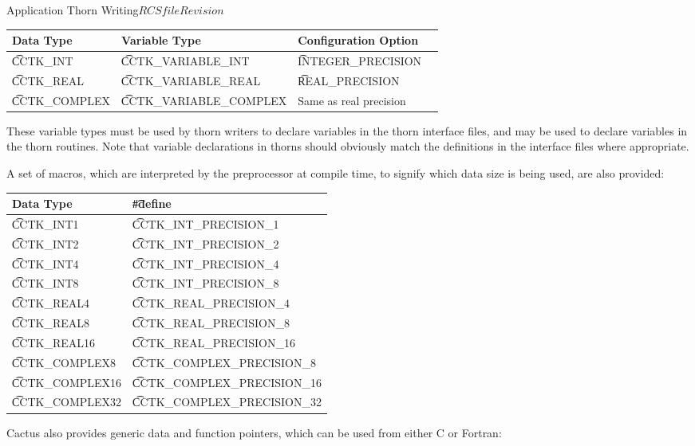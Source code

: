 \begin{cactuspart}{Application Thorn Writing}{$RCSfile$}{$Revision$}
\begin{center}
\begin{tabular}{|l|l|l|l|}
\hline
Data Type          & Variable Type & Configuration Option\\
\hline
{\t CCTK\_INT}     & {\t CCTK\_VARIABLE\_INT} & {\t INTEGER\_PRECISION}\\
{\t CCTK\_REAL}    & {\t CCTK\_VARIABLE\_REAL} & {\t REAL\_PRECISION}\\
{\t CCTK\_COMPLEX} & {\t CCTK\_VARIABLE\_COMPLEX} & Same as real precision\\
\hline
\end{tabular}
\end{center}


These variable types must be used by thorn writers to declare variables
 in the thorn interface files, and may be used to declare
variables in the thorn routines. Note that variable declarations in
thorns should obviously match the definitions in the interface files
where appropriate.

A set of macros, which
are interpreted by the preprocessor at compile time, to signify which
data size is being used, are also provided:

\begin{center}
\begin{tabular}{|l|l|}
\hline
Data Type & {\t \#define}\\
\hline
{\t CCTK\_INT1}      & {\t CCTK\_INT\_PRECISION\_1}      \\
{\t CCTK\_INT2}      & {\t CCTK\_INT\_PRECISION\_2}      \\
{\t CCTK\_INT4}      & {\t CCTK\_INT\_PRECISION\_4}      \\
{\t CCTK\_INT8}      & {\t CCTK\_INT\_PRECISION\_8}      \\
{\t CCTK\_REAL4}     & {\t CCTK\_REAL\_PRECISION\_4}     \\
{\t CCTK\_REAL8}     & {\t CCTK\_REAL\_PRECISION\_8}     \\
{\t CCTK\_REAL16}    & {\t CCTK\_REAL\_PRECISION\_16}    \\
{\t CCTK\_COMPLEX8}  & {\t CCTK\_COMPLEX\_PRECISION\_8}  \\
{\t CCTK\_COMPLEX16} & {\t CCTK\_COMPLEX\_PRECISION\_16} \\
{\t CCTK\_COMPLEX32} & {\t CCTK\_COMPLEX\_PRECISION\_32} \\
\hline
\end{tabular}
\end{center}

Cactus also provides generic data and function pointers, which can
be used from either C or Fortran:


\end{cactuspart}
